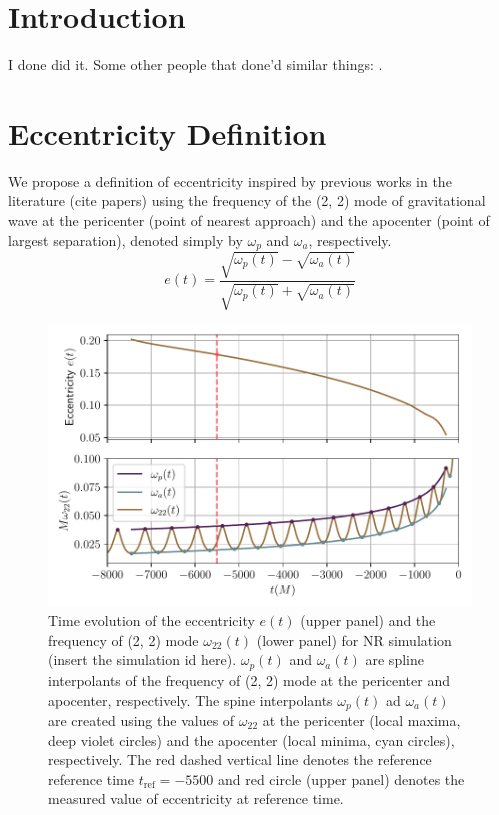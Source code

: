 \documentclass[aps,prd,amsmath,floats,floatfix, twocolumn,
superscriptaddress,nofootinbib,showpacs]{revtex4-1}
\begin{document}
\maketitle

\section{Introduction}
\label{sec:introduction}
I done did it. Some other people that done'd similar things:
\cite{Scott:2015rza}.

\section{Eccentricity Definition}
\label{sec:eccentricity_definition}
We propose a definition of eccentricity inspired by previous works in the literature (cite papers) using the frequency of the (2, 2) mode of gravitational wave at
the pericenter (point of nearest approach) and the apocenter (point of largest separation), denoted simply by $\omega_{p}$ and $\omega_{a}$, respectively.
\begin{equation}
\label{eq:eccentricity_definition}
e(t) = \frac{\sqrt{\omega_{p}(t)} - \sqrt{\omega_{a}(t)}}{\sqrt{\omega_{p}(t)} + \sqrt{\omega_{a}(t)}}
\end{equation}

\begin{figure}[thb]
\includegraphics[width=\columnwidth]{ecc_definition}
\caption{Time evolution of the eccentricity $e(t)$ (upper panel) and the frequency of (2, 2) mode $\omega_{22}(t)$ (lower panel) for NR simulation (insert the simulation id here).
  $\omega_p(t)$ and $\omega_a(t)$ are spline interpolants of the frequency of (2, 2) mode at the pericenter and apocenter, respectively. The spine interpolants $\omega_p(t)$ ad $\omega_a(t)$
  are created using the values of $\omega_{22}$ at the pericenter (local maxima, deep violet circles) and the apocenter (local minima, cyan circles), respectively. The red dashed vertical line
  denotes the reference reference time $t_{\text{ref}}=-5500$ and red circle (upper panel) denotes the measured value of eccentricity at reference time.}
\label{fig:ecc_definition}
\end{figure}
\end{document}
